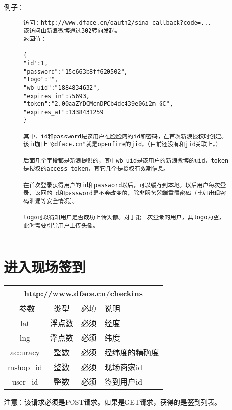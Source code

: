 \documentclass[cs4size]{ctexartutf8}
\begin{document}
例子：

\begin{figure}[H]
\begin{verbatim}
访问：http://www.dface.cn/oauth2/sina_callback?code=...
该访问由新浪微博通过302转向发起。
返回值：

{
"id":1,
"password":"15c663b8ff620502",
"logo":"",
"wb_uid":"1884834632",
"expires_in":75693,
"token":"2.00aaZYDCMcnDPCb4dc439e06i2m_GC",
"expires_at":1338431259
}

其中，id和password是该用户在脸脸网的id和密码，在首次新浪授权时创建。该id加上"@dface.cn"就是openfire的jid。（目前还没有和jid关联上。）

后面几个字段都是新浪提供的，其中wb_uid是该用户的新浪微博的uid，token是授权的access_token，其它几个是授权有效期信息。

在首次登录获得用户的id和password以后，可以缓存到本地。以后用户每次登录，返回的id和password是不会改变的，除非服务器端重置密码（比如出现密码泄漏等安全情况）。

logo可以得知用户是否成功上传头像。对于第一次登录的用户，其logo为空，此时需要引导用户上传头像。


\end{verbatim}
\end{figure}


\section{进入现场签到}

\begin{table}[H]
   \begin{center}
\begin{tabular}{|c|c|c|p{12cm}|}
\hline
\multicolumn{4}{|c|}{http://www.dface.cn/checkins} \\
\hline\hline
 \  参数  & 类型 & 必填 &  说明  \\
\hline
 lat  & 浮点数 & 必须 & 经度\\
\hline
 lng  &  浮点数 & 必须 & 纬度\\ 
\hline
 accuracy  & 整数 & 必须 & 经纬度的精确度\\ 
\hline
 mshop\_id  & 整数 & 必须 &  现场商家id\\ 
\hline
 user\_id  & 整数 & 必须 &  签到用户id\\ 
\hline
\end{tabular}
   \end{center}
\end{table}

注意：该请求必须是POST请求。如果是GET请求，获得的是签到列表。
\end{document}
